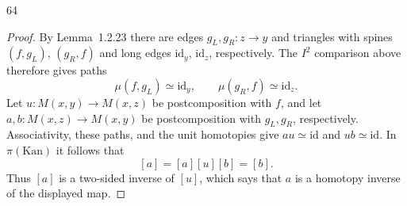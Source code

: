 \begin{exercise}{64}
\begin{proof}
By Lemma~1.2.23 there are edges
$g_L,g_R\colon z\to y$ and triangles with spines
$(f,g_L)$, $(g_R,f)$ and long edges
$\mathrm{id}_y$, $\mathrm{id}_z$, respectively.
The $I^2$ comparison above therefore gives paths
\[
 \mu(f,g_L)\simeq\mathrm{id}_y,
 \qquad \mu(g_R,f)\simeq\mathrm{id}_z.
\]
Let $u\colon M(x,y)\to M(x,z)$ be postcomposition with
$f$, and let $a,b\colon M(x,z)\to M(x,y)$ be
postcomposition with $g_L,g_R$, respectively.
Associativity, these paths, and the unit homotopies give
$au\simeq\mathrm{id}$ and $ub\simeq\mathrm{id}$.
In $\pi(\mathrm{Kan})$ it follows that
\[
 [a]=[a][u][b]=[b].
\]
Thus $[a]$ is a two-sided inverse of $[u]$, which says
that $a$ is a homotopy inverse of the displayed map.
\end{proof}
\end{exercise}
